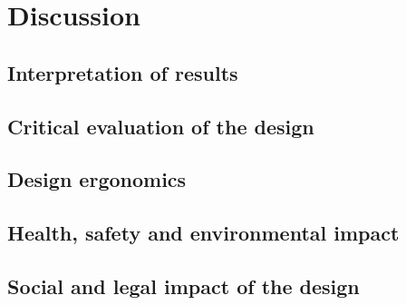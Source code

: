 
\section{Discussion}

\subsection{Interpretation of results}

\subsection{Critical evaluation of the design}

\subsection{Design ergonomics}

\subsection{Health, safety and environmental impact}

\subsection{Social and legal impact of the design}

\newpage



